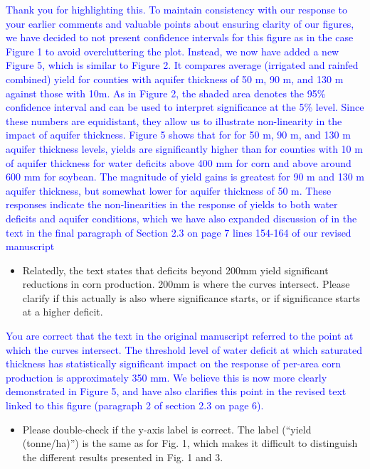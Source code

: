 \documentclass[
]{article}
\providecommand{\tightlist}{%
  \setlength{\itemsep}{0pt}\setlength{\parskip}{0pt}}
\begin{document}
\textcolor{blue}{
Thank you for highlighting this. To maintain consistency with our response to your earlier comments and valuable points about ensuring clarity of our figures, we have decided to not present confidence intervals for this figure as in the case Figure 1 to avoid overcluttering the plot. Instead, we now have added a new Figure 5, which is similar to Figure 2. It compares average (irrigated and rainfed combined) yield for counties with aquifer thickness of 50 m, 90 m, and 130 m against those with 10m. As in Figure 2, the shaded area denotes the 95\% confidence interval and can be used to interpret significance at the 5\% level. Since these numbers are equidistant, they allow us to illustrate non-linearity in the impact of aquifer thickness. Figure 5 shows that for for 50 m, 90 m, and 130 m aquifer thickness levels, yields are significantly higher than for counties with 10 m of aquifer thickness for water deficits above 400 mm for corn and above around 600 mm for soybean. The magnitude of yield gains is greatest for 90 m and 130 m aquifer thickness, but somewhat lower for aquifer thickness of 50 m. These responses indicate the non-linearities in the response of yields to both water deficits and aquifer conditions, which we have also expanded discussion of in the text in the final paragraph of Section 2.3 on page 7 lines 154-164 of our revised manuscript
}

\begin{itemize}
\tightlist
\item
  Relatedly, the text states that deficits beyond 200mm yield
  significant reductions in corn production. 200mm is where the curves
  intersect. Please clarify if this actually is also where significance
  starts, or if significance starts at a higher deficit.
\end{itemize}

\textcolor{blue}{You are correct that the text in the original manuscript referred to the point at which the curves intersect. The threshold level of water deficit at which saturated thickness has statistically significant impact on the response of per-area corn production is approximately 350 mm. We believe this is now more clearly demonstrated in Figure 5, and have also clarifies this point in the revised text linked to this figure (paragraph 2 of section 2.3 on page 6).}

\begin{itemize}
\tightlist
\item
  Please double-check if the y-axis label is correct. The label (``yield
  (tonne/ha)'') is the same as for Fig. 1, which makes it difficult to
  distinguish the different results presented in Fig. 1 and 3.
\end{itemize}
\end{document}
